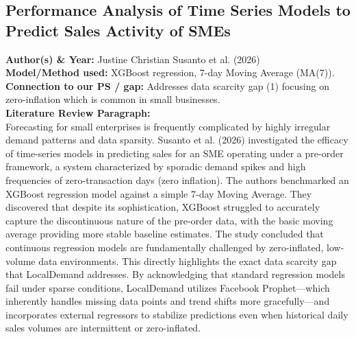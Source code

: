 \documentclass[conference]{IEEEtran}
\begin{document}
\subsection{Performance Analysis of Time Series Models to Predict Sales Activity of SMEs}
\textbf{Author(s) \& Year:} Justine Christian Susanto et al. (2026)\\
\textbf{Model/Method used:} XGBoost regression, 7-day Moving Average (MA(7)).\\
\textbf{Connection to our PS / gap:} Addresses data scarcity gap (1) focusing on zero-inflation which is common in small businesses.\\
\textbf{Literature Review Paragraph:}\\
Forecasting for small enterprises is frequently complicated by highly irregular demand patterns and data sparsity. Susanto et al. (2026) investigated the efficacy of time-series models in predicting sales for an SME operating under a pre-order framework, a system characterized by sporadic demand spikes and high frequencies of zero-transaction days (zero inflation). The authors benchmarked an XGBoost regression model against a simple 7-day Moving Average. They discovered that despite its sophistication, XGBoost struggled to accurately capture the discontinuous nature of the pre-order data, with the basic moving average providing more stable baseline estimates. The study concluded that continuous regression models are fundamentally challenged by zero-inflated, low-volume data environments. This directly highlights the exact data scarcity gap that LocalDemand addresses. By acknowledging that standard regression models fail under sparse conditions, LocalDemand utilizes Facebook Prophet---which inherently handles missing data points and trend shifts more gracefully---and incorporates external regressors to stabilize predictions even when historical daily sales volumes are intermittent or zero-inflated.
\end{document}
